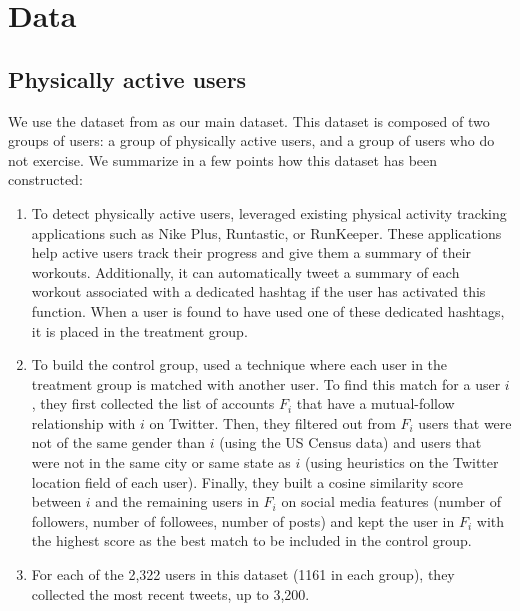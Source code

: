 \documentclass[letterpaper]{article}
\newcommand{\cut}[1]{}
\begin{document}
\section{Data}

\subsection{Physically active users}

\cut {
  - landeiro2015using data
  - explain how it has been built: hashtag of tracking apps gives us the physically active users. matching on social media features, gender, and location gives us the control group.
}

We use the dataset from \cite{landeiro2015using} as our main dataset. This dataset is composed of two groups of users: a group of physically active users, and a group of users who do not exercise. We summarize in a few points how this dataset has been constructed:

\begin{enumerate}
  
  \item To detect physically active users, \citeauthor{landeiro2015using}
  leveraged existing physical activity tracking applications such as Nike Plus,
  Runtastic, or RunKeeper. These applications help active users track their
  progress and give them a summary of their workouts. Additionally, it can
  automatically tweet a summary of each workout associated with a dedicated
  hashtag if the user has activated this function. When a user is found to have
  used one of these dedicated hashtags, it is placed in the treatment group.

  \item To build the control group, \citeauthor{landeiro2015using} used a
  technique where each user in the treatment group is matched with another user.
  To find this match for a user $i$, they first collected the list of accounts
  $F_i$ that have a mutual-follow relationship with $i$ on Twitter. Then, they
  filtered out from $F_i$ users that were not of the same gender than $i$ (using
  the US Census data) and users that were not in the same city or same state as
  $i$ (using heuristics on the Twitter location field of each user). Finally,
  they built a cosine similarity score between $i$ and the remaining users in
  $F_i$ on social media features (number of followers, number of followees,
  number of posts) and kept the user in $F_i$ with the highest score as the best
  match to be included in the control group.

  \item For each of the 2,322 users in this dataset (1161 in each group), they
  collected the most recent tweets, up to 3,200.

\end{enumerate}
\end{document}
